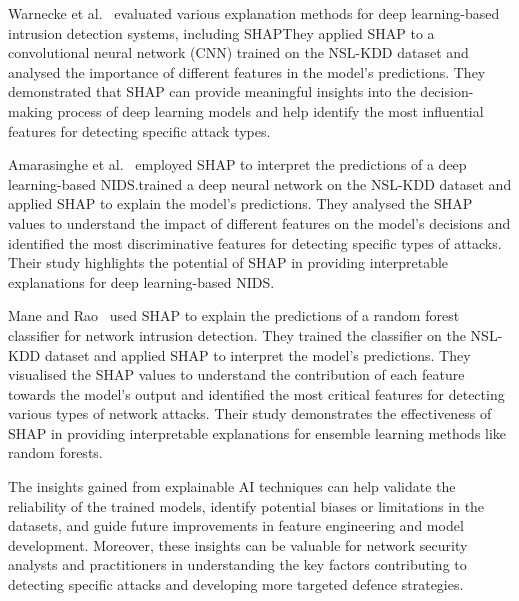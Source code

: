 Warnecke et al.~\cite{warnecke2020evaluating} evaluated various explanation methods for deep learning-based intrusion detection systems, including SHAP\@ They applied SHAP to a convolutional neural network (CNN) trained on the NSL-KDD dataset and analysed the importance of different features in the model's predictions. They demonstrated that SHAP can provide meaningful insights into the decision-making process of deep learning models and help identify the most influential features for detecting specific attack types.

Amarasinghe et al.~\cite{amarasinghe2018toward} employed SHAP to interpret the predictions of a deep learning-based NIDS.\@They trained a deep neural network on the NSL-KDD dataset and applied SHAP to explain the model's predictions. They analysed the SHAP values to understand the impact of different features on the model's decisions and identified the most discriminative features for detecting specific types of attacks. Their study highlights the potential of SHAP in providing interpretable explanations for deep learning-based NIDS.\@

Mane and Rao~\cite{mane2021explaining} used SHAP to explain the predictions of a random forest classifier for network intrusion detection. They trained the classifier on the NSL-KDD dataset and applied SHAP to interpret the model's predictions. They visualised the SHAP values to understand the contribution of each feature towards the model's output and identified the most critical features for detecting various types of network attacks. Their study demonstrates the effectiveness of SHAP in providing interpretable explanations for ensemble learning methods like random forests.

The insights gained from explainable AI techniques can help validate the reliability of the trained models, identify potential biases or limitations in the datasets, and guide future improvements in feature engineering and model development. Moreover, these insights can be valuable for network security analysts and practitioners in understanding the key factors contributing to detecting specific attacks and developing more targeted defence strategies.